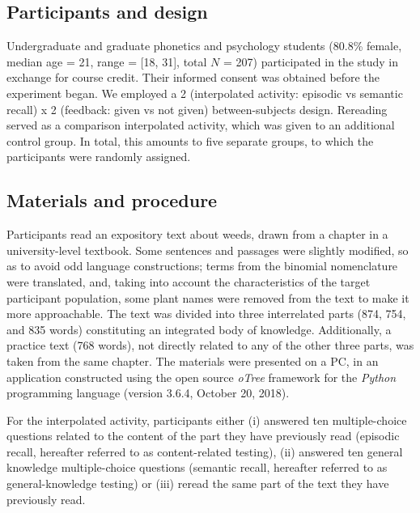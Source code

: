

\hypertarget{participants-and-design}{%
\subsection{Participants and design}\label{participants-and-design}}

Undergraduate and graduate phonetics and psychology students (80.8\%
female, median age = 21, range = {[}18, 31{]}, total \(N\) = 207)
participated in the study in exchange for course credit. 
Their informed consent was obtained before the experiment 
began. We employed a 2 (interpolated activity: episodic vs 
semantic recall) x 2 (feedback: given vs not given) 
between-subjects design. Rereading served as a comparison 
interpolated activity, which was given to an additional 
control group. In total, this amounts to five separate 
groups, to which the participants were randomly assigned.

\hypertarget{materials-and-procedure}{%
\subsection{Materials and procedure}\label{materials-and-procedure}}

Participants read an expository text about weeds, drawn 
from a chapter in a university-level textbook. Some 
sentences and passages were slightly modified, so as to 
avoid odd language constructions; terms from the binomial 
nomenclature were translated, and, taking into account the
characteristics of the target participant population, some 
plant names were removed from the text to make it more 
approachable. The text was divided into three interrelated 
parts (874, 754, and 835 words) constituting an integrated 
body of knowledge. Additionally, a practice text (768 
words), not directly related to any of the other three 
parts, was taken from the same chapter. The materials were 
presented on a PC, in an application constructed using the 
open source \textit{oTree} framework \citep[version 
2.1.35,][]{chenOTreeOpensourcePlatform2016} for
the \textit{Python} programming language (version 3.6.4, 
October 20, 2018).

For the interpolated activity, participants either (i) 
answered ten multiple-choice questions related to the 
content of the part they have previously read (episodic 
recall, hereafter referred to as content-related testing), 
(ii) answered ten general knowledge multiple-choice 
questions (semantic recall, hereafter referred to as
general-knowledge testing) or (iii) reread the same part of 
the text they have previously read.

